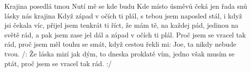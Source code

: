 \begin{TEXT}{Krajina posedlá tmou}
\SLOKA {}   \NL
{}    \NL
Nutí mě  se   \NL
kde budu    \NL
Kde místo úsměvů  čeká jen řada snů  \NL
{} lásky nás    krajina   
\SLOKA Když západ v očích ti plál, \NL
s tebou jsem naposled stál, \NL
i když jsi čekala víc, \NL
přijel jsem tenkrát ti říct, \NL
že mám tě, na každej pád, jedinou na světě rád, \NL
a pak jsem zase jel dál a západ v očích ti plál. 
\SLOKA Proč jsem se vracel tak rád, \NL
proč jsem měl touhu se smát, \NL
když cestou řekli mi: Joe, ta nikdy nebude tvou. \NL
/: Že láska mizí jak dým, to dneska proklatě vím, \NL
jedno však musím se ptát, \NL
proč jsem se vracel tak rád. :/ \NL
\end{TEXT}
